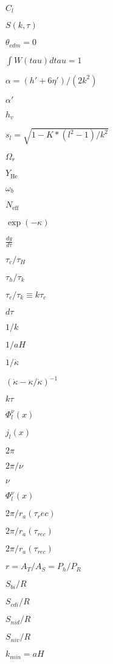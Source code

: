 \documentclass{article}
\begin{document}
$ C_l $
\pagebreak

$ S(k, \tau) $
\pagebreak

$ \theta_{cdm} = 0 $
\pagebreak

$ \int W(tau) dtau=1 $
\pagebreak

$ \alpha = (h' + 6 \eta') / (2 k^2) $
\pagebreak

$ \alpha'$
\pagebreak

$ h_v$
\pagebreak

$ s_l = \sqrt{1-K*(l^2-1)/k^2} $
\pagebreak

$ \Omega_r $
\pagebreak

$ Y_\mathrm{He} $
\pagebreak

$ \omega_b $
\pagebreak

$ N_\mathrm{eff} $
\pagebreak

$ \exp(-\kappa) $
\pagebreak

$ \frac{dg}{d\tau} $
\pagebreak

$ \tau_c/\tau_H $
\pagebreak

$ \tau_h/\tau_k $
\pagebreak

$ \tau_c/\tau_k \equiv k \tau_c $
\pagebreak

$ d \tau $
\pagebreak

$ 1/k $
\pagebreak

$ 1/aH $
\pagebreak

$ 1/\dot{\kappa} $
\pagebreak

$ (\dot{\kappa}- \ddot{\kappa}/\dot{\kappa})^{-1} $
\pagebreak

$ k \tau $
\pagebreak

$ \Phi_l^{\nu}(x)$
\pagebreak

$ j_l(x)$
\pagebreak

$ 2\pi $
\pagebreak

$ 2\pi/\nu$
\pagebreak

$ \nu $
\pagebreak

$ \Phi_l^{\nu}(x) $
\pagebreak

$ 2\pi/r_a(\tau_rec) $
\pagebreak

$ 2\pi/r_a(\tau_{rec})$
\pagebreak

$ 2\pi/r_a(\tau_{rec}) $
\pagebreak

$ r=A_T/A_S=P_h/P_R $
\pagebreak

$ S_{bi}/R $
\pagebreak

$ S_{cdi}/R $
\pagebreak

$ S_{nid}/R $
\pagebreak

$ S_{niv}/R $
\pagebreak

$ k_{min}=aH $
\pagebreak
\end{document}

